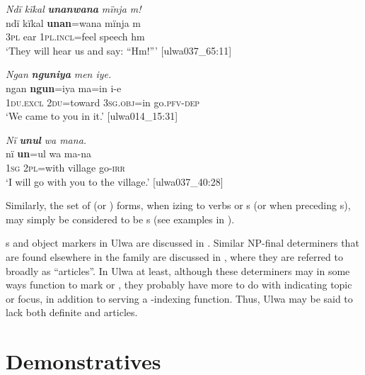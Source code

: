 \ea%
    \label{ex:det:78}
          \textit{Ndï kïkal} \textbf{\textit{unanwana}} \textit{mïnja m!}\\
\gll    ndï  kïkal  \textbf{unan}=wana  mïnja  m\\
    3\textsc{pl}  ear    1\textsc{pl.incl}=feel  speech  hm\\
\glt `They will hear us and say: “Hm!”’ [ulwa037\_65:11]
\z

\ea%
    \label{ex:det:79}
          \textit{Ngan} \textbf{\textit{nguniya}} \textit{men iye.}\\
\gll    ngan    \textbf{ngun}=iya    ma=in      i-e\\
    1\textsc{du.excl}  2\textsc{du}=toward  3\textsc{sg.obj}=in  go.\textsc{pfv-dep}\\
\glt `We came to you in it.’ [ulwa014\_15:31]
\z

\ea%
    \label{ex:det:80}
          \textit{Nï} \textbf{\textit{unul}} \textit{wa mana.}\\
\gll    nï    \textbf{un}=ul    wa    ma-na\\
    1\textsc{sg}  2\textsc{pl}=with  village  go-\textsc{irr}\\
\glt `I will go with you to the village.’ [ulwa037\_40:28]
\z

Similarly, the set of  (or ) forms, when izing to verbs or s (or when preceding s), may simply be considered to be s (see examples in ).

  s and object markers in Ulwa are discussed in \citet[4--7]{Barlow2019a}. Similar NP-final determiners that are found elsewhere in the  family are discussed in \citet[51--54]{KillianBarlow2022}, where they are referred to broadly as “articles”. In Ulwa at least, although these determiners may in some ways function to mark  or , they probably have more to do with indicating topic or focus, in addition to serving a -indexing function. Thus, Ulwa may be said to lack both definite and  articles.



\newpage

\section{Demonstratives}\label{sec:7.3}

